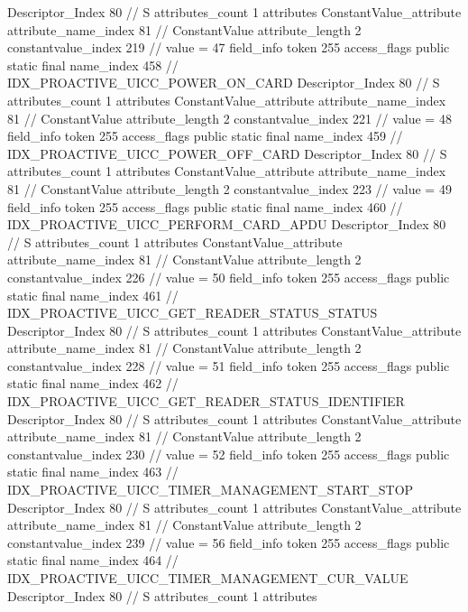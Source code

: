 {{{{{				Descriptor_Index	80		// S
				attributes_count	1
				attributes {
				ConstantValue_attribute {
					attribute_name_index	81		// ConstantValue
					attribute_length	2
					constantvalue_index	219		// value = 47
				}
				}
			}
			field_info {
				token	255
				access_flags	public static final
				name_index	458		// IDX_PROACTIVE_UICC_POWER_ON_CARD
				Descriptor_Index	80		// S
				attributes_count	1
				attributes {
				ConstantValue_attribute {
					attribute_name_index	81		// ConstantValue
					attribute_length	2
					constantvalue_index	221		// value = 48
				}
				}
			}
			field_info {
				token	255
				access_flags	public static final
				name_index	459		// IDX_PROACTIVE_UICC_POWER_OFF_CARD
				Descriptor_Index	80		// S
				attributes_count	1
				attributes {
				ConstantValue_attribute {
					attribute_name_index	81		// ConstantValue
					attribute_length	2
					constantvalue_index	223		// value = 49
				}
				}
			}
			field_info {
				token	255
				access_flags	public static final
				name_index	460		// IDX_PROACTIVE_UICC_PERFORM_CARD_APDU
				Descriptor_Index	80		// S
				attributes_count	1
				attributes {
				ConstantValue_attribute {
					attribute_name_index	81		// ConstantValue
					attribute_length	2
					constantvalue_index	226		// value = 50
				}
				}
			}
			field_info {
				token	255
				access_flags	public static final
				name_index	461		// IDX_PROACTIVE_UICC_GET_READER_STATUS_STATUS
				Descriptor_Index	80		// S
				attributes_count	1
				attributes {
				ConstantValue_attribute {
					attribute_name_index	81		// ConstantValue
					attribute_length	2
					constantvalue_index	228		// value = 51
				}
				}
			}
			field_info {
				token	255
				access_flags	public static final
				name_index	462		// IDX_PROACTIVE_UICC_GET_READER_STATUS_IDENTIFIER
				Descriptor_Index	80		// S
				attributes_count	1
				attributes {
				ConstantValue_attribute {
					attribute_name_index	81		// ConstantValue
					attribute_length	2
					constantvalue_index	230		// value = 52
				}
				}
			}
			field_info {
				token	255
				access_flags	public static final
				name_index	463		// IDX_PROACTIVE_UICC_TIMER_MANAGEMENT_START_STOP
				Descriptor_Index	80		// S
				attributes_count	1
				attributes {
				ConstantValue_attribute {
					attribute_name_index	81		// ConstantValue
					attribute_length	2
					constantvalue_index	239		// value = 56
				}
				}
			}
			field_info {
				token	255
				access_flags	public static final
				name_index	464		// IDX_PROACTIVE_UICC_TIMER_MANAGEMENT_CUR_VALUE
				Descriptor_Index	80		// S
				attributes_count	1
				attributes {
}}}}}}
